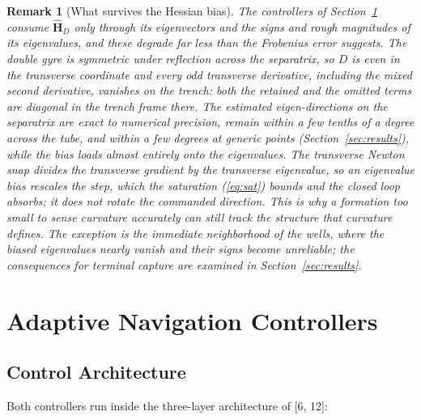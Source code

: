 \documentclass[lettersize,journal]{IEEEtran}
\newtheorem{remark}{Remark}
\begin{document}
\begin{remark}[What survives the Hessian bias]
\label{rem:eigvec}
The controllers of Section~\ref{sec:controllers} consume
$\hat{\mathbf{H}}_D$ only through its eigenvectors and the signs and
rough magnitudes of its eigenvalues, and these degrade far less than the
Frobenius error suggests. The double gyre is symmetric under reflection
across the separatrix, so $D$ is even in the transverse coordinate and
every odd transverse derivative, including the mixed second derivative,
vanishes on the trench: both the retained and the omitted terms are
diagonal in the trench frame there. The estimated eigen-directions on
the separatrix are exact to numerical precision, remain within a few
tenths of a degree across the tube, and within a few degrees at generic
points (Section~\ref{sec:results}), while the bias loads almost entirely
onto the eigenvalues. The transverse Newton snap divides the transverse
gradient by the transverse eigenvalue, so an eigenvalue bias rescales
the step, which the saturation (\ref{eq:sat}) bounds and the closed loop
absorbs; it does not rotate the commanded direction. This is why a
formation too small to sense curvature accurately can still track the
structure that curvature defines. The exception is the immediate
neighborhood of the wells, where the biased eigenvalues nearly vanish
and their signs become unreliable; the consequences for terminal capture
are examined in Section~\ref{sec:results}.
\end{remark}


\section{Adaptive Navigation Controllers}
\label{sec:controllers}

\subsection{Control Architecture}
\label{sec:arch}

Both controllers run inside the three-layer architecture of [6, 12]:
\end{document}
